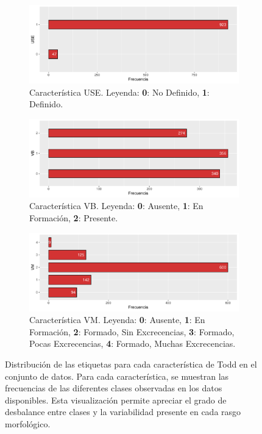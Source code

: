 \begin{figure}[p]
    \ContinuedFloat

    \begin{subfigure}{\textwidth}
        \includegraphics[width=\linewidth]{../../scripts/eda/eda_univar/char_use_distr.pdf}
        \caption{Característica USE. Leyenda: \textbf{0}: No Definido, \textbf{1}: Definido.}
        \label{fig4:todd_chars__use}
    \end{subfigure}

    \begin{subfigure}{\textwidth}
        \includegraphics[width=\linewidth]{../../scripts/eda/eda_univar/char_vb_distr.pdf}
        \caption{Característica VB. Leyenda: \textbf{0}: Ausente, \textbf{1}: En Formación, \textbf{2}: Presente.}
        \label{fig4:todd_chars__vb}
    \end{subfigure}

    \begin{subfigure}{\textwidth}
        \includegraphics[width=\linewidth]{../../scripts/eda/eda_univar/char_vm_distr.pdf}
        \caption{Característica VM. Leyenda: \textbf{0}: Ausente, \textbf{1}: En Formación, \textbf{2}: Formado, Sin Excrecencias, \textbf{3}: Formado, Pocas Excrecencias, \textbf{4}: Formado, Muchas Excrecencias.}
        \label{fig4:todd_chars__vm}
    \end{subfigure}
    \caption[Distribución de las características de Todd]{Distribución de las etiquetas para cada característica de Todd en el conjunto de datos. Para cada característica, se muestran las frecuencias de las diferentes clases observadas en los datos disponibles. Esta visualización permite apreciar el grado de desbalance entre clases y la variabilidad presente en cada rasgo morfológico.}


\end{figure}
